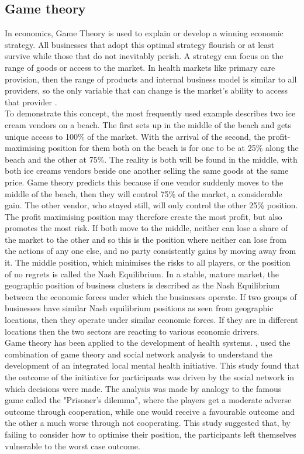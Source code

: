 \documentclass[11pt,a4paper]{article}
\begin{document}
\subsection{Game theory}
In economics, Game Theory is used to explain or develop a winning economic strategy. All businesses that adopt this optimal strategy flourish or at least survive while those that do not inevitably perish. A strategy can focus on the range of goods or access to the market. In health markets like primary care provision, then the range of products and internal business model is similar to all providers, so the  only variable that can change is the market's ability to access that provider \citep{dinar2008game}. \\

To demonstrate this concept, the most frequently used example describes two ice cream vendors on a beach. The first sets up in the middle of the beach and gets unique access to 100\% of the market. With the arrival of the second, the profit-maximising position for them both on the beach is for one to be at 25\% along the beach and the other at 75\%. The reality is both will be found in the middle, with both ice creams vendors beside one another selling the same goods at the same price. Game theory predicts this because if one vendor suddenly moves to the middle of the beach, then they will control 75\% of the market, a considerable gain. The other vendor, who stayed still, will only control the other 25\% position. The profit maximising position may therefore create the most profit, but also promotes the most risk. If both move to the middle, neither can lose a share of the market to the other and so this is the position where neither can lose from the actions of any one else, and no party consistently gains by moving away from it. The middle position, which minimises the risks to all players, or the position of no regrets is called the Nash Equilibrium. In a stable, mature market, the geographic position of business clusters is described as  the Nash Equilibrium between the economic forces under which the businesses operate. If two groups of businesses have similar Nash equilibrium positions as seen from geographic locations, then they operate under similar economic forces. If they are in different locations then the two sectors are reacting to various economic drivers. \\

Game theory has been applied to the development of health systems. \citep{dobson2004sustainable}, used the combination of game theory and social network analysis to understand the development of an integrated local mental health initiative. This study found that the outcome of the initiative for participants was driven by the social network in which decisions were made. The analysis was made by analogy to the famous game called the "Prisoner's dilemma", where the players get a moderate adverse outcome through cooperation, while one would receive a favourable outcome and the other a much worse through not cooperating. This study suggested that, by failing to consider how to optimise their position, the participants left themselves vulnerable to the worst case outcome. \\
\end{document}
